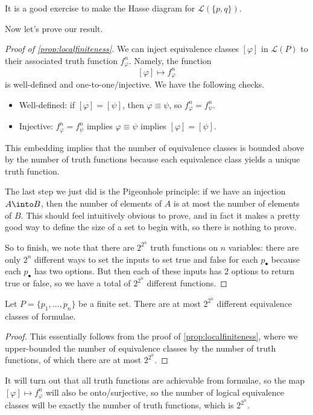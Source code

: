 \documentclass[../notes.tex]{subfiles}
\begin{document}
It is a good exercise to make the Hasse diagram for $\mathcal L(\{p,q\})$.

Now let's prove our result.
\begin{proof}[Proof of \autoref{prop:localfiniteness}]
	We can inject equivalence classes $[\varphi]$ in $\mathcal L(P)$ to their associated truth function $f_\varphi^n$. Namely, the function
	\[[\varphi]\mapsto f_\varphi^n\]
	is well-defined and one-to-one/injective. We have the following checks.
	\begin{itemize}
		\item Well-defined: if $[\varphi]=[\psi]$, then $\varphi\equiv\psi$, so $f_\varphi^n=f_\psi^n$.
		\item Injective: $f_\varphi^n=f_\psi^n$ implies $\varphi\equiv\psi$ implies $[\varphi]=[\psi]$.
	\end{itemize}
	This embedding implies that the number of equivalence classes is bounded above by the number of truth functions because each equivalence class yields a unique truth function.
	\begin{remark}
		The last step we just did is the Pigeonhole principle: if we have an injection $A\into B$, then the number of elements of $A$ is at most the number of elements of $B$. This should feel intuitively obvious to prove, and in fact it makes a pretty good way to define the size of a set to begin with, so there is nothing to prove.
	\end{remark}
	So to finish, we note that there are $2^{2^n}$ truth functions on $n$ variables: there are only $2^n$ different ways to set the inputs to set true and false for each $p_\bullet$ because each $p_\bullet$ has two options. But then each of these inputs has $2$ options to return true or false, so we have a total of $2^{2^n}$ different functions.
\end{proof}
\begin{corollary} \label{cor:countequivclasses}
	Let $P=\{p_1,\ldots,p_n\}$ be a finite set. There are at most $2^{2^n}$ different equivalence classes of formulae.
\end{corollary}
\begin{proof}
	This essentially follows from the proof of \autoref{prop:localfiniteness}, where we upper-bounded the number of equivalence classes by the number of truth functions, of which there are at most $2^{2^n}$.
\end{proof}
\begin{remark} \label{rem:completeness}
	It will turn out that all truth functions are achievable from formulae, so the map $[\varphi]\mapsto f_\varphi^n$ will also be onto/surjective, so the number of logical equivalence classes will be exactly the number of truth functions, which is $2^{2^n}$.
\end{remark}
\end{document}
